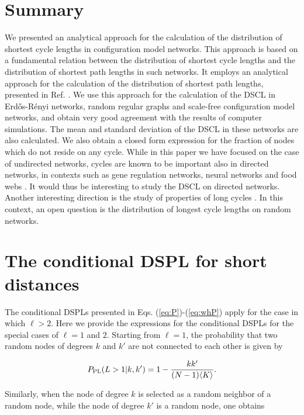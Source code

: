 \documentclass[preprint,pre,superscriptaddress,showpacs]{revtex4}
\begin{document}
\section{Summary}

We presented an analytical approach for the calculation 
of the distribution of shortest 
cycle lengths in configuration model networks.
This approach is based on a fundamental relation between the
distribution of shortest cycle lengths and the distribution 
of shortest path lengths
in such networks.
It employs an analytical approach for the calculation of the distribution
of shortest path lengths, presented in Ref. 
\cite{Nitzan2016}.
We use this approach for the calculation of the DSCL in
Erd{\H o}s-R\'enyi networks, random regular graphs and
scale-free configuration model networks,
and obtain very good agreement with the results of computer simulations.
The mean and standard deviation of the DSCL in these 
networks are also calculated. 
We also obtain a closed form expression for  
the fraction
of nodes which do not reside on any cycle.
While in this paper we have focused on the case of undirected networks,
cycles are known to be important also in directed networks,
in contexts such as gene regulation networks, neural networks 
and food webs 
\cite{Johnson2017}.
It would thus be interesting to study the DSCL on directed networks.
Another interesting direction is the study of properties of long cycles
\cite{Marinari2007}.
In this context, an open question is the distribution
of longest cycle lengths on random networks.

\appendix


\section{The conditional DSPL for short distances}

The conditional DSPLs presented in 
Eqs. (\ref{eq:P})-(\ref{eq:whP}) 
apply for the case in which $\ell > 2$. 
Here we provide 
the expressions for the conditional DSPLs for the
special cases of $\ell=1$ and $2$.
Starting from $\ell=1$, the probability that
two random nodes of degrees $k$ and $k'$ are not connected to
each other is given by

\begin{equation}
P_{\rm PL}(L>1 | k,k') = 1 - \frac{k k'}{(N-1) \langle K \rangle}.
\end{equation}

\noindent
Similarly, when the node of degree $k$ is selected as a random
neighbor of a random node, while the node of degree $k'$ is
a random node, one obtains
\end{document}
